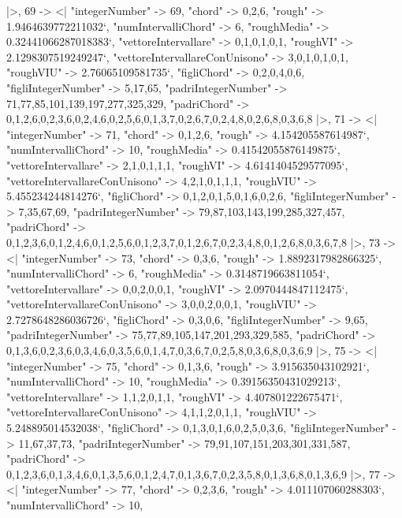 \documentclass[
]{article}
\begin{document}
\begin{DatasetVerbatim}
  |>,
  69 -> <|
    "integerNumber" -> 69,
    "chord" -> {0,2,6},
    "rough" -> 1.9464639772211032`,
    "numIntervalliChord" -> 6,
    "roughMedia" -> 0.32441066287018383`,
    "vettoreIntervallare" -> {0,1,0,1,0,1},
    "roughVI" -> 2.1298307519249247`,
    "vettoreIntervallareConUnisono" -> {3,0,1,0,1,0,1},
    "roughVIU" -> 2.76065109581735`,
    "figliChord" -> {{0,2},{0,4},{0,6}},
    "figliIntegerNumber" -> {5,17,65},
    "padriIntegerNumber" -> {71,77,85,101,139,197,277,325,329},
    "padriChord" -> {{0,1,2,6},{0,2,3,6},{0,2,4,6},{0,2,5,6},{0,1,3,7},{0,2,6,7},{0,2,4,8},{0,2,6,8},{0,3,6,8}}
  |>,
  71 -> <|
    "integerNumber" -> 71,
    "chord" -> {0,1,2,6},
    "rough" -> 4.154205587614987`,
    "numIntervalliChord" -> 10,
    "roughMedia" -> 0.41542055876149875`,
    "vettoreIntervallare" -> {2,1,0,1,1,1},
    "roughVI" -> 4.6141404529577095`,
    "vettoreIntervallareConUnisono" -> {4,2,1,0,1,1,1},
    "roughVIU" -> 5.455234244814276`,
    "figliChord" -> {{0,1,2},{0,1,5},{0,1,6},{0,2,6}},
    "figliIntegerNumber" -> {7,35,67,69},
    "padriIntegerNumber" -> {79,87,103,143,199,285,327,457},
    "padriChord" -> {{0,1,2,3,6},{0,1,2,4,6},{0,1,2,5,6},{0,1,2,3,7},{0,1,2,6,7},{0,2,3,4,8},{0,1,2,6,8},{0,3,6,7,8}}
  |>,
  73 -> <|
    "integerNumber" -> 73,
    "chord" -> {0,3,6},
    "rough" -> 1.8892317982866325`,
    "numIntervalliChord" -> 6,
    "roughMedia" -> 0.3148719663811054`,
    "vettoreIntervallare" -> {0,0,2,0,0,1},
    "roughVI" -> 2.0970444847112475`,
    "vettoreIntervallareConUnisono" -> {3,0,0,2,0,0,1},
    "roughVIU" -> 2.7278648286036726`,
    "figliChord" -> {{0,3},{0,6}},
    "figliIntegerNumber" -> {9,65},
    "padriIntegerNumber" -> {75,77,89,105,147,201,293,329,585},
    "padriChord" -> {{0,1,3,6},{0,2,3,6},{0,3,4,6},{0,3,5,6},{0,1,4,7},{0,3,6,7},{0,2,5,8},{0,3,6,8},{0,3,6,9}}
  |>,
  75 -> <|
    "integerNumber" -> 75,
    "chord" -> {0,1,3,6},
    "rough" -> 3.915635043102921`,
    "numIntervalliChord" -> 10,
    "roughMedia" -> 0.39156350431029213`,
    "vettoreIntervallare" -> {1,1,2,0,1,1},
    "roughVI" -> 4.407801222675471`,
    "vettoreIntervallareConUnisono" -> {4,1,1,2,0,1,1},
    "roughVIU" -> 5.248895014532038`,
    "figliChord" -> {{0,1,3},{0,1,6},{0,2,5},{0,3,6}},
    "figliIntegerNumber" -> {11,67,37,73},
    "padriIntegerNumber" -> {79,91,107,151,203,301,331,587},
    "padriChord" -> {{0,1,2,3,6},{0,1,3,4,6},{0,1,3,5,6},{0,1,2,4,7},{0,1,3,6,7},{0,2,3,5,8},{0,1,3,6,8},{0,1,3,6,9}}
  |>,
  77 -> <|
    "integerNumber" -> 77,
    "chord" -> {0,2,3,6},
    "rough" -> 4.011107060288303`,
    "numIntervalliChord" -> 10,

\end{DatasetVerbatim}
\end{document}
